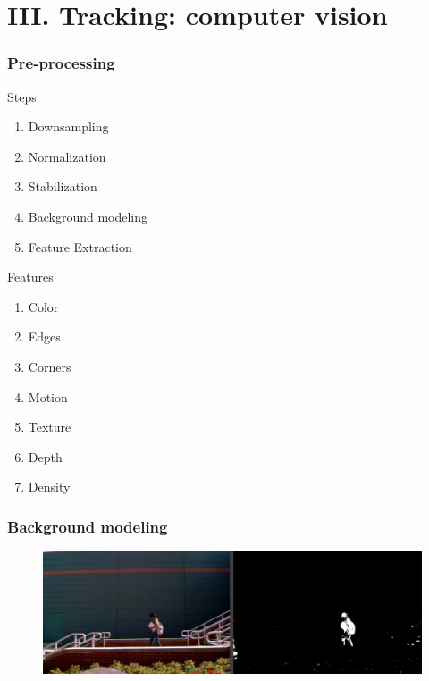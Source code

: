 \section{III. Tracking: computer vision}


\begin{frame}
\frametitle{Pre-processing}
\logoCSIPCPL\mypagenum
	{\color{red}Steps}
	\begin{enumerate}
		\item Downsampling
		\item Normalization
		\item Stabilization
		\item Background modeling
		\item Feature Extraction
	\end{enumerate}
	\vspace{0.3in}
	{\color{red}Features}
	\begin{enumerate}
		\item Color
		\item Edges
		\item Corners
		\item Motion
		\item Texture
		\item Depth
		\item Density
	\end{enumerate}
\end{frame}


\begin{frame}
\frametitle{Background modeling}
\logoCSIPCPL\mypagenum
	\begin{figure}		
		\centering		
		\includegraphics[width=1.0\textwidth]{figs/Proposal_fig12_TRK_multiGaussian.pdf}
		\label{fig:MultiGaussian}
	\end{figure}
\end{frame}


